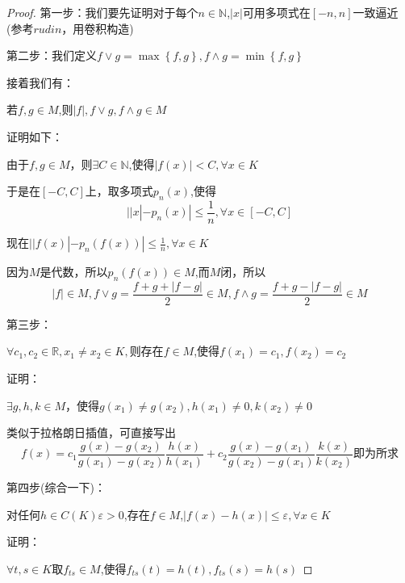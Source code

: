 \documentclass[lang=cn,10pt]{elegantbook}
\begin{document}
	\begin{proof}
		
		第一步：我们要先证明对于每个$n\in \mathbb{N} $,$|x|$可用多项式在$[-n,n]$一致逼近(参考$rudin$，用卷积构造)
		
		第二步：我们定义$f\lor g=\max \left\{ f,g \right\} ,f\land g=\min \left\{ f,g \right\} $
		
		接着我们有：
		
		若$f,g\in M$,则$|f|,f\lor g,f\land g \in M$
		
		证明如下：
		
		由于$f,g\in M$，则$\exists C\in\mathbb{N}$,使得$|f(x)|<C,\forall x \in K$
		
		于是在$[-C,C]$上，取多项式$p_{n}(x)$,使得
		\begin{equation*}
			||x|-p_{n}(x)|\le\frac{1}{n},\forall x \in [-C,C]
		\end{equation*}
		
		现在$||f(x)|-p_{n}(f(x))|\le\frac{1}{n},\forall x \in K$
		
		因为$M$是代数，所以$p_{n}(f(x))\in M$,而$M$闭，所以		
		\begin{equation*}
			|f|\in M,f\lor g=\frac{f+g+|f-g|}{2}\in M,f\land g=\frac{f+g-|f-g|}{2}\in M
		\end{equation*}
		
		第三步：
		
		$\forall c_{1},c_{2}\in \mathbb{R},x_{1}\ne x_{2}\in K,$则存在$f\in M$,使得$f(x_{1})=c_{1},f(x_{2})=c_{2}$
		
		证明：
		
		$\exists g,h,k \in M$，使得$g(x_{1})\ne g(x_{2}),h(x_{1})\ne 0,k(x_{2})\ne0$
		
		类似于拉格朗日插值，可直接写出
		\begin{equation*}
			f\left( x \right) =c_1\frac{g\left( x \right) -g\left( x_2 \right)}{g\left( x_1 \right) -g\left( x_2 \right)}\frac{h\left( x \right)}{h\left( x_1 \right)}+c_2\frac{g\left( x \right) -g\left( x_1 \right)}{g\left( x_2 \right) -g\left( x_1 \right)}\frac{k\left( x \right)}{k\left( x_2 \right)}\text{即为所求}
		\end{equation*}
		
		第四步(综合一下)：
		
		对任何$h\in C(K) \varepsilon >0$,存在$f \in M$,$|f(x)-h(x)|\le \varepsilon ,\forall x\in K$
		
		证明：
		
		$\forall t,s \in K$取$f_{ts} \in M$,使得$f_{ts}(t)=h(t),f_{ts}(s)=h(s)$
		

\end{proof}
\end{document}
